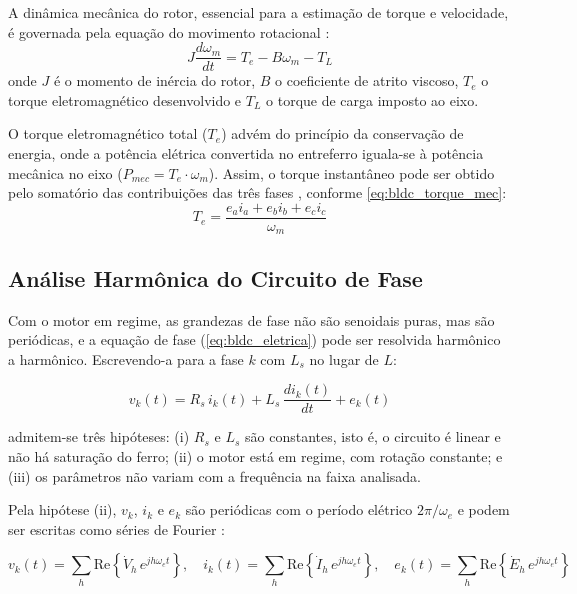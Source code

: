 A dinâmica mecânica do rotor, essencial para a estimação de torque e velocidade, é governada pela equação do movimento rotacional \cite{Fitzgerald2014}:
\begin{equation}
    J \frac{d\omega_m}{dt} = T_e - B\omega_m - T_L
    \label{eq:bldc_mecanica}
\end{equation}
onde $J$ é o momento de inércia do rotor, $B$ o coeficiente de atrito viscoso, $T_e$ o torque eletromagnético desenvolvido e $T_L$ o torque de carga imposto ao eixo. 

O torque eletromagnético total ($T_e$) advém do princípio da conservação de energia, onde a potência elétrica convertida no entreferro iguala-se à potência mecânica no eixo ($P_{mec} = T_e \cdot \omega_m$). Assim, o torque instantâneo pode ser obtido pelo somatório das contribuições das três fases \cite{Krishnan2017}, conforme \eqref{eq:bldc_torque_mec}:
\begin{equation}
    T_e = \frac{e_a i_a + e_b i_b + e_c i_c}{\omega_m}
    \label{eq:bldc_torque_mec}
\end{equation}

\subsection{Análise Harmônica do Circuito de Fase}
\label{sec:analise_harmonica}

Com o motor em regime, as grandezas de fase não são senoidais puras, mas são
periódicas, e a equação de fase (\autoref{eq:bldc_eletrica}) pode ser
resolvida harmônico a harmônico. Escrevendo-a para a fase $k$ com $L_s$ no
lugar de $L$:

\begin{equation}
    v_k(t) = R_s\,i_k(t) + L_s\,\frac{di_k(t)}{dt} + e_k(t)
    \label{eq:Lajuste_passo1}
\end{equation}

\noindent admitem-se três hipóteses: (i) $R_s$ e $L_s$ são constantes, isto
é, o circuito é linear e não há saturação do ferro; (ii) o motor está em
regime, com rotação constante; e (iii) os parâmetros não variam com a
frequência na faixa analisada.

Pela hipótese (ii), $v_k$, $i_k$ e $e_k$ são periódicas com o período elétrico
$2\pi/\omega_e$ e podem ser escritas como séries de Fourier
\cite{alexander2013circuitos}:

\begin{equation}
    v_k(t) = \sum_{h} \mathrm{Re}\!\left\{\dot{V}_h\,e^{jh\omega_e t}\right\},\quad
    i_k(t) = \sum_{h} \mathrm{Re}\!\left\{\dot{I}_h\,e^{jh\omega_e t}\right\},\quad
    e_k(t) = \sum_{h} \mathrm{Re}\!\left\{\dot{E}_h\,e^{jh\omega_e t}\right\}
    \label{eq:Lajuste_passo2}
\end{equation}

